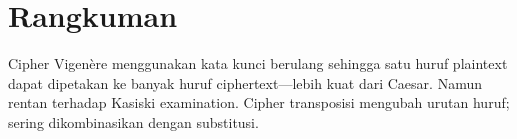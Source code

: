 \section*{Rangkuman}
Cipher Vigenère menggunakan kata kunci berulang sehingga satu huruf plaintext dapat dipetakan ke banyak huruf ciphertext---lebih kuat dari Caesar. Namun rentan terhadap Kasiski examination. Cipher transposisi mengubah urutan huruf; sering dikombinasikan dengan substitusi.
